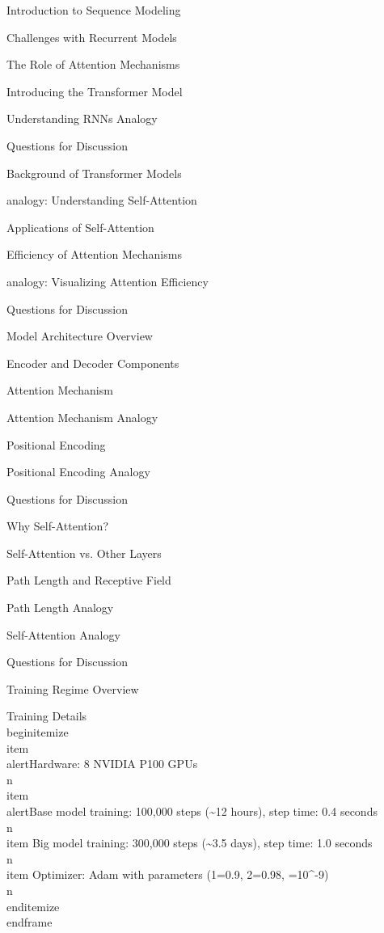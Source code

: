 \documentclass{beamer}
\begin{document}
\begin{frame}[]{Introduction to Sequence Modeling}
\begin{frame}[]{Challenges with Recurrent Models}
\begin{frame}[]{The Role of Attention Mechanisms}
\begin{frame}[]{Introducing the Transformer Model}
\begin{frame}[plain]{Understanding RNNs Analogy}
\begin{frame}[]{Questions for Discussion}
\begin{frame}[]{Background of Transformer Models}
\begin{frame}[plain]{analogy: Understanding Self-Attention}
\begin{frame}[]{Applications of Self-Attention}
\begin{frame}[]{Efficiency of Attention Mechanisms}
\begin{frame}[plain]{analogy: Visualizing Attention Efficiency}
\begin{frame}[]{Questions for Discussion}
\begin{frame}[]{Model Architecture Overview}
\begin{frame}[]{Encoder and Decoder Components}
\begin{frame}[]{Attention Mechanism}
\begin{frame}[plain]{Attention Mechanism Analogy}
\begin{frame}[]{Positional Encoding}
\begin{frame}[plain]{Positional Encoding Analogy}
\begin{frame}[]{Questions for Discussion}
\begin{frame}[]{Why Self-Attention?}
\begin{frame}[]{Self-Attention vs. Other Layers}
\begin{frame}[]{Path Length and Receptive Field}
\begin{frame}[plain]{Path Length Analogy}
\begin{frame}[plain]{Self-Attention Analogy}
\begin{frame}[]{Questions for Discussion}
\begin{frame}[]{Training Regime Overview}
\begingroup
{}\n{}\n\begin{frame}[]{Training Details}\n\\begin{itemize}
\\item \\alert{Hardware: 8 NVIDIA P100 GPUs}\\n\\item \\alert{Base model training: 100,000 steps (\textasciitilde{}12 hours), step time: 0.4 seconds}\\n\\item Big model training: 300,000 steps (\textasciitilde{}3.5 days), step time: 1.0 seconds\\n\\item Optimizer: Adam with parameters (1=0.9, 2=0.98, =10\textasciicircum{}-9)\\n\\end{itemize}
\\end{frame}

\endgroup


\end{frame}
\end{frame}
\end{frame}
\end{frame}
\end{frame}
\end{frame}
\end{frame}
\end{frame}
\end{frame}
\end{frame}
\end{frame}
\end{frame}
\end{frame}
\end{frame}
\end{frame}
\end{frame}
\end{frame}
\end{frame}
\end{frame}
\end{frame}
\end{frame}
\end{frame}
\end{frame}
\end{frame}
\end{frame}
\end{frame}
\end{frame}
\end{document}
